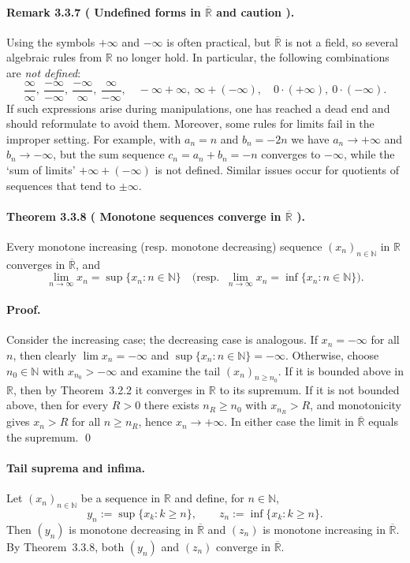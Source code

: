 \documentclass[12pt]{article}
\newcommand{\N}{\mathbb{N}}
\newcommand{\R}{\mathbb{R}}
\newcommand{\NumberedTheorem}[3]{%
\paragraph*{Theorem #1 ( #2 ).} #3\par}
\newcommand{\NumberedRemark}[3]{%
\paragraph*{Remark #1 ( #2 ).} #3\par}
\begin{document}
\NumberedRemark{3.3.7}{Undefined forms in $\overline{\R}$ and caution}{Using the symbols $+\infty$ and $-\infty$ is often practical, but $\overline{\R}$ is not a field, so several algebraic rules from $\R$ no longer hold. In particular, the following combinations are \emph{not defined}:
\[
	\frac{\infty}{\infty},\ \frac{-\infty}{-\infty},\ \frac{-\infty}{\infty},\ \frac{\infty}{-\infty},\quad
	-\infty + \infty,\ \infty + (-\infty),\quad 0\cdot(+\infty),\ 0\cdot(-\infty).
\]
If such expressions arise during manipulations, one has reached a dead end and should reformulate to avoid them. Moreover, some rules for limits fail in the improper setting. For example, with $a_n=n$ and $b_n=-2n$ we have $a_n\to +\infty$ and $b_n\to -\infty$, but the sum sequence $c_n=a_n+b_n=-n$ converges to $-\infty$, while the `sum of limits' $+\infty+(-\infty)$ is not defined. Similar issues occur for quotients of sequences that tend to $\pm\infty$.}

\NumberedTheorem{3.3.8}{Monotone sequences converge in $\overline{\R}$}{Every monotone increasing (resp. monotone decreasing) sequence $(x_n)_{n\in\N}$ in $\R$ converges in $\overline{\R}$, and
\[
	\lim_{n\to\infty} x_n = \sup\{x_n: n\in\N\}\quad \big(\text{resp. }\ \lim_{n\to\infty} x_n = \inf\{x_n: n\in\N\}\big).
\]
\paragraph{Proof.} Consider the increasing case; the decreasing case is analogous. If $x_n=-\infty$ for all $n$, then clearly $\lim x_n=-\infty$ and $\sup\{x_n:n\in\N\}=-\infty$. Otherwise, choose $n_0\in\N$ with $x_{n_0}>-\infty$ and examine the tail $(x_n)_{n\ge n_0}$. If it is bounded above in $\R$, then by Theorem~3.2.2 it converges in $\R$ to its supremum. If it is not bounded above, then for every $R>0$ there exists $n_R\ge n_0$ with $x_{n_R}>R$, and monotonicity gives $x_n>R$ for all $n\ge n_R$, hence $x_n\to +\infty$. In either case the limit in $\overline{\R}$ equals the supremum. \qed}

\paragraph{Tail suprema and infima.} Let $(x_n)_{n\in\N}$ be a sequence in $\R$ and define, for $n\in\N$,
\[
	y_n := \sup\{ x_k : k\ge n\}, \qquad z_n := \inf\{ x_k : k\ge n\}.
\]
Then $(y_n)$ is monotone decreasing in $\overline{\R}$ and $(z_n)$ is monotone increasing in $\overline{\R}$. By Theorem~3.3.8, both $(y_n)$ and $(z_n)$ converge in $\overline{\R}$.
\end{document}
